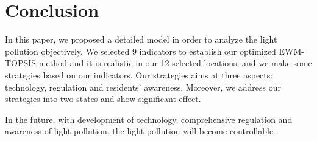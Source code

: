 \MinParskip{}

\section{Conclusion}

In this paper, we proposed a detailed model in order to analyze the light pollution objectively. We selected 9 indicators to establish our optimized EWM-TOPSIS method and it is realistic in our 12 selected locations, and we make some strategies based on our indicators. Our strategies aims at three aspects: technology, regulation and residents' awareness. Moreover, we address our strategies into two states and show significant effect.

In the future, with development of technology, comprehensive regulation and awareness of light pollution, the light pollution will become controllable.
